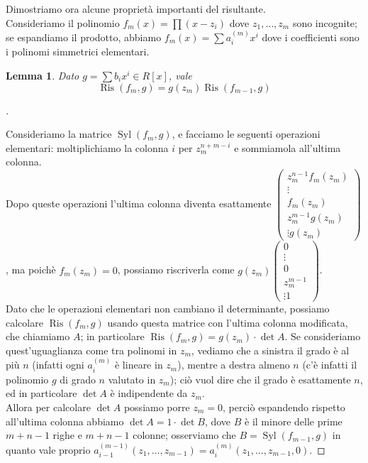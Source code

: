 \documentclass[a4paper,10pt]{article}
\theoremstyle{plain}
\newtheorem{lemma}[thm]{Lemma}
\theoremstyle{definition}
\newenvironment{myproof}[1][\proofname]{%
  \begin{proof}[#1]$ $\par\nobreak\ignorespaces
}{%
  \qedhere
  \end{proof}
}
\DeclareMathOperator{\Syl}{Syl}
\DeclareMathOperator{\Ris}{Ris}
\begin{document}
Dimostriamo ora alcune proprietà importanti del risultante.\\
Consideriamo il polinomio $f_m(x)=\prod(x-z_i)$ dove $z_1,\dots,z_m$ sono incognite; se espandiamo il prodotto, abbiamo $f_m(x)=\sum a_i^{(m)}x^i$ dove i coefficienti sono i polinomi simmetrici elementari.
\begin{lemma}
    Dato $g=\sum b_ix^i\in R[x]$, vale $$\Ris(f_m,g)=g(z_m)\Ris(f_{m-1},g)$$
\end{lemma}
\begin{myproof}
    Consideriamo la matrice $\Syl(f_m,g)$, e facciamo le seguenti operazioni elementari: moltiplichiamo la colonna $i$ per $z_m^{n+m-i}$ e sommiamola all'ultima colonna.\\
    Dopo queste operazioni l'ultima colonna diventa esattamente $\begin{pmatrix} z_m^{n-1}f_m(z_m) \\ \vdots \\ f_m(z_m) \\ z_m^{m-1}g(z_m) \\ \vdots g(z_m) \end{pmatrix}$, ma poichè $f_m(z_m)=0$, possiamo riscriverla come $g(z_m)\begin{pmatrix} 0 \\ \vdots \\ 0 \\ z_m^{m-1} \\ \vdots 1 \end{pmatrix}$.\\
    Dato che le operazioni elementari non cambiano il determinante, possiamo calcolare $\Ris(f_m,g)$ usando questa matrice con l'ultima colonna modificata, che chiamiamo $A$; in particolare $\Ris(f_m,g)=g(z_m)\cdot\det A$. Se consideriamo quest'uguaglianza come tra polinomi in $z_m$, vediamo che a sinistra il grado è al più $n$ (infatti ogni $a_i^{(m)}$ è lineare in $z_m$), mentre a destra almeno $n$ (c'è infatti il polinomio $g$ di grado $n$ valutato in $z_m$); ciò vuol dire che il grado è esattamente $n$, ed in particolare $\det A$ è indipendente da $z_m$.\\
    Allora per calcolare $\det A$ possiamo porre $z_m=0$, perciò espandendo rispetto all'ultima colonna abbiamo $\det A=1\cdot\det B$, dove $B$ è il minore delle prime $m+n-1$ righe e $m+n-1$ colonne; osserviamo che $B=\Syl(f_{m-1},g)$ in quanto vale proprio $a_{i-1}^{(m-1)}(z_1,\dots,z_{m-1})=a_i^{(m)}(z_1,\dots,z_{m-1},0)$.
\end{myproof}
\end{document}
